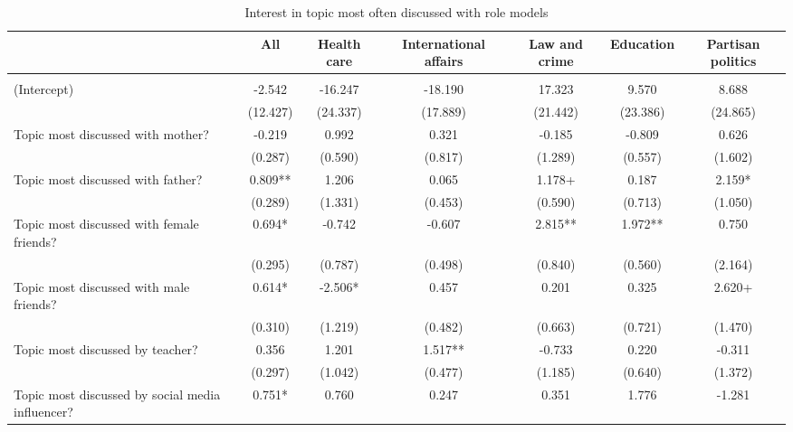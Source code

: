 \documentclass[
  letterpaper,
  DIV=11,
  numbers=noendperiod]{scrreprt}
\begin{document}
\begin{table}

\caption{Interest in topic most often discussed with role models }
\centering
\fontsize{6}{8}\selectfont
\begin{tabular}[t]{lcccccc}
\toprule
  & All & Health care & International affairs & Law and crime & Education & Partisan politics\\
\midrule
\addlinespace[0.5em]
\multicolumn{7}{l}{\textit{Boys}}\\
\midrule \hspace{1em}(Intercept) & -2.542 & -16.247 & -18.190 & 17.323 & 9.570 & 8.688\\
\hspace{1em} & (12.427) & (24.337) & (17.889) & (21.442) & (23.386) & (24.865)\\
\hspace{1em}Topic most discussed with mother? & -0.219 & 0.992 & 0.321 & -0.185 & -0.809 & 0.626\\
\hspace{1em} & (0.287) & (0.590) & (0.817) & (1.289) & (0.557) & (1.602)\\
\hspace{1em}Topic most discussed with father? & 0.809** & 1.206 & 0.065 & 1.178+ & 0.187 & 2.159*\\
\hspace{1em} & (0.289) & (1.331) & (0.453) & (0.590) & (0.713) & (1.050)\\
\hspace{1em}Topic most discussed with female friends? & 0.694* & -0.742 & -0.607 & 2.815** & 1.972** & 0.750\\
\hspace{1em} & (0.295) & (0.787) & (0.498) & (0.840) & (0.560) & (2.164)\\
\hspace{1em}Topic most discussed with male friends? & 0.614* & -2.506* & 0.457 & 0.201 & 0.325 & 2.620+\\
\hspace{1em} & (0.310) & (1.219) & (0.482) & (0.663) & (0.721) & (1.470)\\
\hspace{1em}Topic most discussed by teacher? & 0.356 & 1.201 & 1.517** & -0.733 & 0.220 & -0.311\\
\hspace{1em} & (0.297) & (1.042) & (0.477) & (1.185) & (0.640) & (1.372)\\
\hspace{1em}Topic most discussed by social media influencer? & 0.751* & 0.760 & 0.247 & 0.351 & 1.776 & -1.281\\

\end{tabular}
\end{table}
\end{document}
